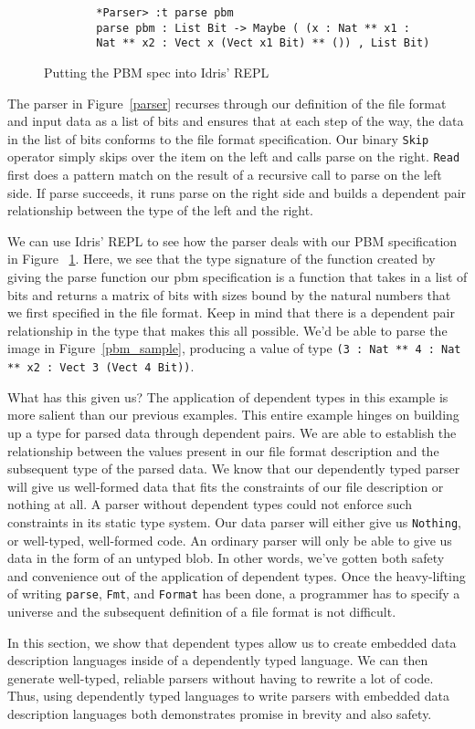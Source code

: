 \begin{figure}[ht]
    \caption{Putting the PBM spec into Idris' REPL}
    \label{repl}
    \begin{lstlisting}
        *Parser> :t parse pbm 
        parse pbm : List Bit -> Maybe ( (x : Nat ** x1 :
        Nat ** x2 : Vect x (Vect x1 Bit) ** ()) , List Bit)
    \end{lstlisting}
\end{figure}

The parser in Figure~\ref{parser} recurses through our definition of the file
format and input data as a list of bits and ensures that at each step of the
way, the data in the list of bits conforms to the file format specification. Our
binary \texttt{Skip} operator simply skips over the item on the left and calls
parse on the right. \texttt{Read} first does a pattern match on the result of
a recursive call to parse on the left side. If parse succeeds, it runs parse
on the right side and builds a dependent pair relationship between the type
of the left and the right. 

We can use Idris' REPL to see how the parser deals with our PBM specification in
Figure ~\ref{repl}. Here, we see that the type signature of the function created
by giving the parse function our pbm specification is a function that takes in a
list of bits and returns a matrix of bits with sizes bound by the natural
numbers that we first specified in the file format. Keep in mind that there is a
dependent pair relationship in the type that makes this all possible. We'd be
able to parse the image in Figure~\ref{pbm_sample}, producing a value of type
\texttt{(3 : Nat ** 4 : Nat ** x2 : Vect 3 (Vect 4 Bit))}. 

What has this given us? The application of dependent types in this example is
more salient than our previous examples. This entire example hinges on building
up a type for parsed data through dependent pairs. We are able to establish the
relationship between the values present in our file format description and the
subsequent type of the parsed data. We know that our dependently typed parser
will give us well-formed data that fits the constraints of our file description
or nothing at all. A parser without dependent types could not enforce such
constraints in its static type system. Our data parser will either give us
\texttt{Nothing}, or well-typed, well-formed code. An ordinary parser will only
be able to give us data in the form of an untyped blob. In other words, we've
gotten both safety and convenience out of the application of dependent types.
Once the heavy-lifting of writing \texttt{parse}, \texttt{Fmt}, and
\texttt{Format} has been done, a programmer has to specify a universe and the
subsequent definition of a file format is not difficult.  

In this section, we show that dependent types allow us to create embedded data
description languages inside of a dependently typed language. We can then
generate well-typed, reliable parsers without having to rewrite a lot of code.
Thus, using dependently typed languages to write parsers with embedded data
description languages both demonstrates promise in brevity and also safety. 
